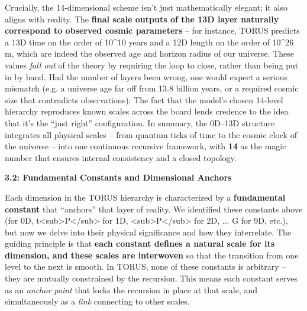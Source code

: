 \documentclass[
]{article}
\begin{document}
Crucially, the 14-dimensional scheme isn't just mathematically elegant;
it also aligns with reality. The \textbf{final scale outputs of the 13D
layer naturally correspond to observed cosmic parameters} -- for
instance, TORUS predicts a 13D time on the order of 10\^{}10 years and a
12D length on the order of 10\^{}26 m, which are indeed the observed age
and horizon radius of our universe\hspace{0pt}. These values \emph{fall
out} of the theory by requiring the loop to close, rather than being put
in by hand. Had the number of layers been wrong, one would expect a
serious mismatch (e.g. a universe age far off from 13.8 billion years,
or a required cosmic size that contradicts observations). The fact that
the model's chosen 14-level hierarchy reproduces known scales across the
board lends credence to the idea that it's the ``just right''
configuration. In summary, the 0D--13D structure integrates all physical
scales -- from quantum ticks of time to the cosmic clock of the universe
-- into one continuous recursive framework, with \textbf{14} as the
magic number that ensures internal consistency and a closed
topology\hspace{0pt}.

\textbf{3.2: Fundamental Constants and Dimensional Anchors}

Each dimension in the TORUS hierarchy is characterized by a
\textbf{fundamental constant} that ``anchors'' that layer of reality. We
identified these constants above (\alpha for 0D,
t\textless sub\textgreater P\textless/sub\textgreater{} for 1D,
\ell\textless sub\textgreater P\textless/sub\textgreater{} for 2D, ... G
for 9D, etc.), but now we delve into their physical significance and how
they interrelate. The guiding principle is that \textbf{each constant
defines a natural scale for its dimension, and these scales are
interwoven} so that the transition from one level to the next is smooth.
In TORUS, none of these constants is arbitrary -- they are mutually
constrained by the recursion. This means each constant serves as an
\emph{anchor point} that locks the recursion in place at that scale, and
simultaneously as a \emph{link} connecting to other scales.
\end{document}
